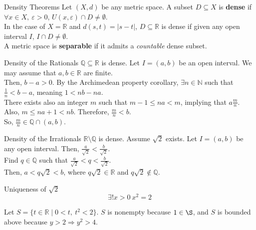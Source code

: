 \documentclass[10pt]{extarticle}
\newcommand{\N}{\mathbb{N}}
\newcommand{\Q}{\mathbb{Q}}
\newcommand{\R}{\mathbb{R}}
\begin{document}
  \begin{problem}{Density Theorems}
    Let $(X,d)$ be any metric space. A subset $D\subseteq X$ is \textbf{dense} if $\forall x\in X,~ \varepsilon > 0$, $U(x,\varepsilon) \cap D \neq \emptyset$.\\

    In the case of $X = \R$ and $d(s,t) = |s-t|$, $D\subseteq \R$ is dense if given any open interval $I$, $I\cap D \neq \emptyset$.\\

    A metric space is \textbf{separable} if it admits a \textit{countable} dense subset.
    \begin{problem}{Density of the Rationals}
      $\Q\subseteq\R$ is dense.
      \tcblower
      Let $I = (a,b)$ be an open interval. We may assume that $a,b\in\R$ are finite.\\

      Then, $b-a > 0$. By the Archimedean property corollary, $\exists n\in\N$ such that $\frac{1}{n} < b-a$, meaning $1 < nb-na$.\\

      There exists also an integer $m$ such that $m-1 \leq na < m$, implying that $a \frac{m}{n}$. Also, $m \leq na+1 < nb$. Therefore, $\frac{m}{n} < b$.\\

      So, $\frac{m}{n}\in \Q\cap (a,b)$.
    \end{problem}
    \begin{problem}{Density of the Irrationals}
      $\R\setminus\Q$ is dense.
      \tcblower
      Assume $\sqrt{2}$ exists. Let $I = (a,b)$ be any open interval. Then, $\frac{a}{\sqrt{2}} < \frac{b}{\sqrt{2}}$.\\

      Find $q\in\Q$ such that $\frac{a}{\sqrt{2}} < q < \frac{b}{\sqrt{2}}$.\\

      Then, $a < q\sqrt{2} < b$, where $q\sqrt{2} \in\R$ and $q\sqrt{2}\notin\Q$.
    \end{problem}
    \begin{problem}{Uniqueness of $\sqrt{2}$}
      \[
        \exists! x>0~x^2 = 2
      \] 
      \tcblower
      \begin{description}[font=\normalfont]
        \item[Existence:] Let $S = \{t\in\R \mid 0 <t,~t^2<2\}$. $S$ is nonempty because $1\in\S$, and $S$ is bounded above because $y > 2 \Rightarrow y^2 > 4$.\\


\end{description}
\end{problem}
\end{problem}
\end{document}
